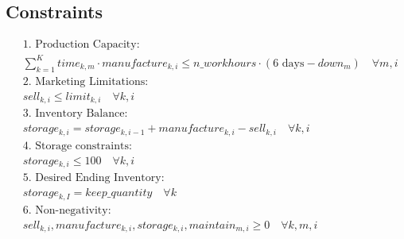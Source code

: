 \documentclass{article}
\begin{document}
\subsection*{Constraints}
\begin{align}
    & \text{1. Production Capacity:} \\
    & \sum_{k=1}^{K} time_{k, m} \cdot manufacture_{k, i} \leq n\_workhours \cdot (6 \text{ days} - down_m) \quad \forall m, i \\
    
    & \text{2. Marketing Limitations:} \\
    & sell_{k, i} \leq limit_{k, i} \quad \forall k, i \\
    
    & \text{3. Inventory Balance:} \\
    & storage_{k, i} = storage_{k, i-1} + manufacture_{k, i} - sell_{k, i} \quad \forall k, i \\
    
    & \text{4. Storage constraints:} \\
    & storage_{k, i} \leq 100 \quad \forall k, i \\
    
    & \text{5. Desired Ending Inventory:} \\
    & storage_{k, I} = keep\_quantity \quad \forall k \\
    
    & \text{6. Non-negativity:} \\
    & sell_{k, i}, manufacture_{k, i}, storage_{k, i}, maintain_{m, i} \geq 0 \quad \forall k, m, i
\end{align}
\end{document}
